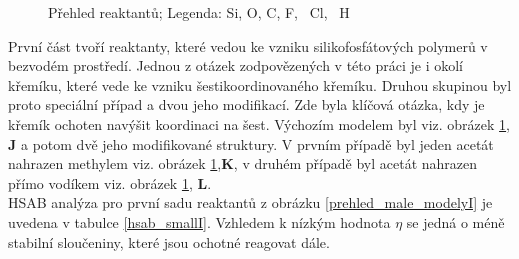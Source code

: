 \documentclass[
digital, %
table,   %
lof,     %
lot,     %
oneside,
]{fithesis3}
\begin{document}
\begin{figure}
\centering
{}
\caption{Přehled reaktantů; Legenda:  Si,  O,  C,  F, ~Cl, ~H}
\label{prehled_male_modely_II}
\end{figure}

První část tvoří reaktanty, které vedou ke vzniku silikofosfátových polymerů v bezvodém prostředí. Jednou z otázek zodpovězených v této práci je i okolí křemíku, které vede ke vzniku šestikoordinovaného křemíku. Druhou skupinou byl proto speciální případ  a dvou jeho modifikací. Zde byla klíčová otázka, kdy je křemík ochoten navýšit koordinaci na šest. Výchozím modelem byl  viz. obrázek \ref{prehled_male_modely_II}, \textbf{J} a potom dvě jeho modifikované struktury. V prvním případě byl jeden acetát nahrazen methylem   viz. obrázek \ref{prehled_male_modely_II},\textbf{K}, v druhém případě byl acetát nahrazen přímo vodíkem viz. obrázek  \ref{prehled_male_modely_II}, \textbf{L}. \\

HSAB analýza pro první sadu reaktantů z obrázku \ref{prehled_male_modelyI} je uvedena v tabulce \ref{hsab_smallI}. Vzhledem k nízkým hodnota $\eta$ se jedná o méně stabilní sloučeniny, které jsou ochotné reagovat dále.
\end{document}
